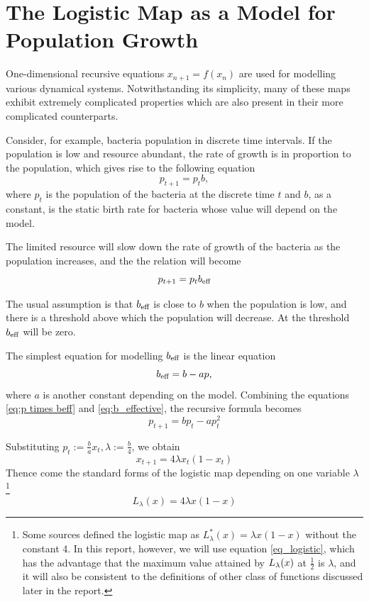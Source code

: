 \section{The Logistic Map as a Model for Population Growth}

One-dimensional recursive equations $x_{n+1} = f(x_n)$ are used for modelling various dynamical systems. 
Notwithstanding its simplicity, many of these maps exhibit extremely complicated properties which are also present in their more complicated counterparts.

Consider, for example, bacteria population in discrete time intervals. 
If the population is low and resource abundant, the rate of growth is in proportion to the population, which gives rise to the following equation
\begin{equation}\label{eq:1d iterative map}
p_{t+1} = p_{t} b,
\end{equation}
where $p_{t}$ is the population of the bacteria at the discrete time $t$ and $b$, as a constant, is the static birth rate for bacteria whose value will depend on the model.

The limited resource will slow down the rate of growth of the bacteria as the population increases, and the the relation will become 
\begin{equation}\label{eq:p times beff}
	p_{t+1} =  p_{t} b_\text{eff}
\end{equation}

The usual assumption is that $b_\text{eff}$ is close to $b$ when the population is low, and there is a threshold above which the population will decrease. 
At the threshold $b_\text{eff}$ will be zero.

The simplest equation for modelling $b_\text{eff}$ is the linear equation
\begin{equation} \label{eq:b_effective}
b_\text{eff} = b - ap,
\end{equation}
where $a$ is another constant depending on the model.
Combining the equations \eqref{eq:p times beff} and \eqref{eq:b_effective}, the recursive formula becomes 
$$
p_{t+1}  = b p_t - ap_t^2
$$

Substituting $p_{t} := \frac{b}{a} x_{t}, \lambda := \frac{b}{4}$, we obtain
$$
x_{t+1} = 4 \lambda x_t(1-x_t) 
$$
Thence come the standard forms of the logistic map depending on one variable $\lambda$
\footnote{
Some sources defined the logistic map as $L^*_{\lambda}(x) = \lambda x(1-x)$ without the constant 4. 
In this report, however, we will use equation \ref{eq_logistic}, which has the advantage that the maximum value attained by $L_{\lambda}(x)$ at $\frac{1}{2}$ is $\lambda$, and it will also be consistent to the definitions of other class of functions discussed later in the report.
}
\begin{equation}\label{eq_logistic}
	L_{\lambda}(x) = 4 \lambda x(1-x)
\end{equation}

